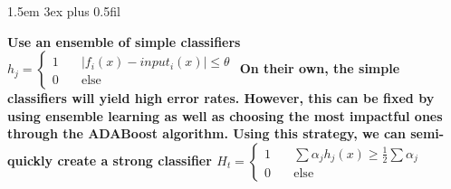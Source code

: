 \documentclass[11pt]{article}
\begin{document}
\addtolength{\topmargin}{-1.5in}
\setlength{\footskip}{200pt}
\parindent 1.5em \itemsep 3ex plus 0.5fil
\def\arraystretch{1.2}
 
 \textbf{\newline\newline\newline\newline\newline\newline\newline\newline\newline\newline\newline\newline\newline\newline\newline
 	    \newline\newline\newline\newline\newline\newline\newline}
 \textbf{Use an ensemble of simple classifiers
 	    $h_{j} = \begin{cases} 1 & \quad |f_{i}(x) - input_{i}(x)| \leq \theta\\ 0 & \quad \text{else} \end{cases}$
 	    On their own, the simple classifiers will yield high error rates. However, this can be fixed by using ensemble learning as well as
	    choosing the most impactful ones through the ADABoost algorithm. Using this strategy, we can semi-quickly create a strong
	    classifier
	    $H_{t} = \begin{cases} 1 & \quad \sum{\alpha_{j}h_{j}(x)} \geq \frac{1}{2}\sum{\alpha_{j}}\\ 0 & \quad \text{else} \end{cases}$
	    \newline\newline}
 
\end{document}
